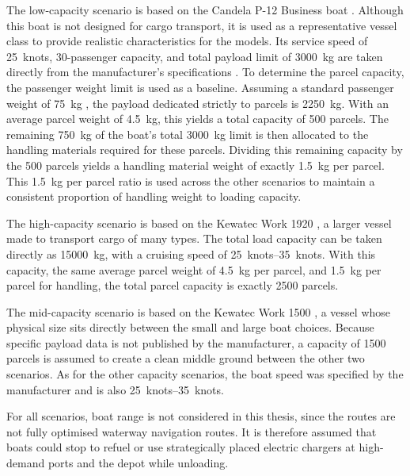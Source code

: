 \documentclass[12pt]{article}
\begin{document}
The low-capacity scenario is based on the Candela P-12 Business boat \parencite{candela2026p12}. Although this boat is not designed for cargo transport, it is used as a representative vessel class to provide realistic characteristics for the models. Its service speed of \qty{25}{knots}, \num{30}-passenger capacity, and total payload limit of \qty{3000}{\kilogram} are taken directly from the manufacturer's specifications \parencite{candela2026p12}. To determine the parcel capacity, the passenger weight limit is used as a baseline. Assuming a standard passenger weight of \qty{75}{\kilogram} \parencite{passengerkg}, the payload dedicated strictly to parcels is \qty{2250}{\kilogram}. With an average parcel weight of \qty{4.5}{\kilogram}, this yields a total capacity of \num{500} parcels. The remaining \qty{750}{\kilogram} of the boat's total \qty{3000}{\kilogram} limit is then allocated to the handling materials required for these parcels. Dividing this remaining capacity by the \num{500} parcels yields a handling material weight of exactly \qty{1.5}{\kilogram} per parcel. This \qty{1.5}{\kilogram} per parcel ratio is used across the other scenarios to maintain a consistent proportion of handling weight to loading capacity.

The high-capacity scenario is based on the Kewatec Work 1920 \parencite{kewatec_work_1920}, a larger vessel made to transport cargo of many types. The total load capacity can be taken directly as \qty{15000}{\kilogram}, with a cruising speed of \qtyrange{25}{35}{knots}. With this capacity, the same average parcel weight of \qty{4.5}{\kilogram} per parcel, and \qty{1.5}{\kilogram} per parcel for handling, the total parcel capacity is exactly \num{2500} parcels.

The mid-capacity scenario is based on the Kewatec Work 1500 \parencite{kewatec_work_1500}, a vessel whose physical size sits directly between the small and large boat choices. Because specific payload data is not published by the manufacturer, a capacity of \num{1500} parcels is assumed to create a clean middle ground between the other two scenarios. As for the other capacity scenarios, the boat speed was specified by the manufacturer and is also \qtyrange{25}{35}{knots}.

For all scenarios, boat range is not considered in this thesis, since the routes are not fully optimised waterway navigation routes. It is therefore assumed that boats could stop to refuel or use strategically placed electric chargers at high-demand ports and the depot while unloading.
\end{document}
